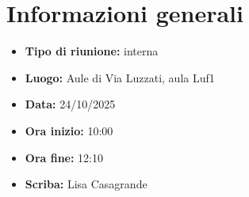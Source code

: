 \section{Informazioni generali}

\begin{itemize}
    \item \textbf{Tipo di riunione:} interna
    \item \textbf{Luogo:} Aule di Via Luzzati, aula Luf1
    \item \textbf{Data:} 24/10/2025
    \item \textbf{Ora inizio:} 10:00
    \item \textbf{Ora fine:} 12:10
    \item \textbf{Scriba:} Lisa Casagrande
\end{itemize}